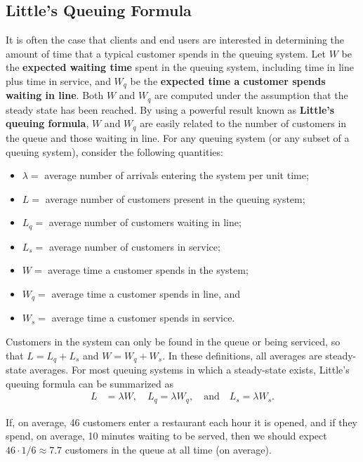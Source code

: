 \subsection{Little's Queuing Formula}
It is often the case that clients and end users are interested in determining the amount of time that a typical customer spends in the queuing system. Let $W$ be the \textbf{expected waiting time} spent in the queuing system, including time in line plus time in service, and $W_{q}$ be the \textbf{expected time a customer spends waiting in line}. Both $W$ and $W_{q}$ are computed under the assumption that the steady state has been reached. By using a powerful result known as \textbf{Little's queuing formula}, $W$ and $W_{q}$ are easily related to the number of customers in the queue and those waiting in line. \newl  For any queuing system (or any subset of a queuing system), consider the following quantities:
\begin{itemize}[noitemsep]
\item $\lambda = $  average number of arrivals entering the system per unit time; 
\item $L =$  average number of customers present in the queuing system;
\item $L_{q} = $  average number of customers waiting in line;
\item $L_{s} = $  average number of customers in service;
\item $W = $  average time a customer spends in the system;
\item $W_{q} = $  average time a customer spends in line, and
\item $W_{s} = $  average time a customer spends in service.
\end{itemize}
Customers in the system can only be found in the queue or being serviced, so that $L = L_{q} + L_{s}$ and $W = W_{q} + W_{s}$. In these definitions, all averages are steady-state averages. For most queuing systems in which a steady-state exists, Little's queuing formula can be summarized as 
\begin{align*}
L &=  \lambda W, \quad L_{q} = \lambda W_{q}, \quad\mbox{and}
\quad L_{s}= \lambda W_{s}.
\end{align*}
\begin{Example} If, on average, 46 customers enter a restaurant each hour it is opened, and if they spend, on average, 10 minutes waiting to be served, then we should expect $46\cdot 1/6 \approx 7.7$ customers in the queue at all time (on average).   \end{Example}

